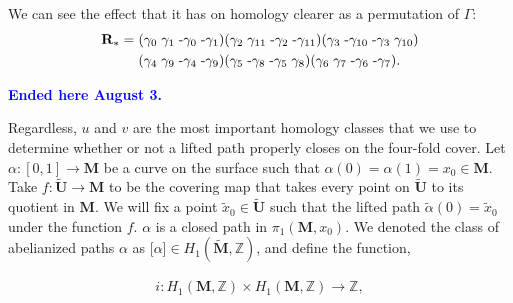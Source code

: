 \documentclass[]{article}
\newcommand{\compav}[1]{\textbf{\textcolor{blue}{#1}}}
\begin{document}
\vspace{2mm}
We can see the effect that it has on homology clearer as a permutation of $\Gamma$:
\begin{align*}
\mathbf{R}_*= \hspace{1mm} &(\gamma_{0}\hspace{1mm}\gamma_{1}\hspace{1mm}\text{-}\gamma_{0}\hspace{1mm}\text{-}\gamma_{1})
(\gamma_{2}\hspace{1mm}\gamma_{11}\hspace{1mm}\text{-}\gamma_{2}\hspace{1mm}\text{-}\gamma_{11})
(\gamma_{3}\hspace{1mm}\text{-}\gamma_{10}\hspace{1mm}\text{-}\gamma_{3}\hspace{1mm}\gamma_{10})\\
&(\gamma_{4}\hspace{1mm}\gamma_{9}\hspace{1mm}\text{-}\gamma_{4}\hspace{1mm}\text{-}\gamma_{9})
(\gamma_{5}\hspace{1mm}\text{-}\gamma_{8}\hspace{1mm}\text{-}\gamma_{5}\hspace{1mm}\gamma_{8})
(\gamma_{6}\hspace{1mm}\gamma_{7}\hspace{1mm}\text{-}\gamma_{6}\hspace{1mm}\text{-}\gamma_{7}).
\end{align*}

\compav{Ended here August 3.}

Regardless, $u$ and $v$ are the most important homology classes that we use to determine whether or not a lifted path properly closes on the four-fold cover.  Let $\alpha:[0,1]\rightarrow\mathbf M$ be a curve on the surface such that $\alpha(0)=\alpha(1)=x_0\in\mathbf{M}$. Take $f:\tilde{\mathbf U}\rightarrow\mathbf M$ to be the covering map that takes every point on $\tilde{\mathbf U}$ to its quotient in $\mathbf{M}$. We will fix a point $\tilde{x}_0\in\tilde{\mathbf U}$ such that the lifted path $\tilde\alpha(0)=\tilde{x}_0$ under the function $f$. $\alpha$ is a closed path in $\pi_1(\mathbf M,x_0)$. We denoted the class of abelianized paths $\alpha$ as [$\alpha$]$\in H_1(\tilde{\mathbf{M}},\mathbb Z)$, and define the function,

\begin{align}
i:H_1(\mathbf{M},\mathbb Z)\times H_1(\mathbf{M},\mathbb Z)\rightarrow \mathbb Z,
\end{align}
\end{document}

